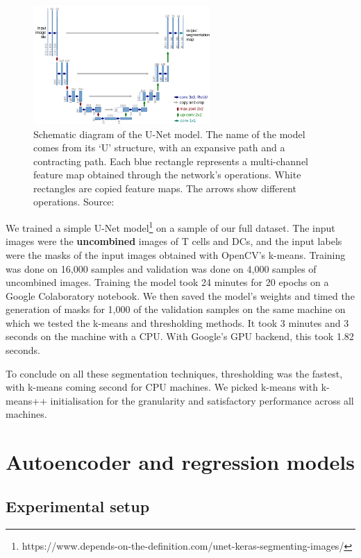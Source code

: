\begin{figure}[h!]
    \centering
    \includegraphics[width=0.6\textwidth]{dissertation/figures/unet_model.png}
    \caption{Schematic diagram of the U-Net model. The name of the model comes from its `U' structure, with an expansive path and a contracting path. Each blue rectangle represents a multi-channel feature map obtained through the network's operations. White rectangles are copied feature maps. The arrows show different operations. Source: \citet{ronneberger_unet_2015}}
    \label{fig:unet}
\end{figure}

We trained a simple U-Net model\footnote{https://www.depends-on-the-definition.com/unet-keras-segmenting-images/} on a sample of our full dataset. The input images were the \textbf{uncombined} images of T cells and DCs, and the input labels were the masks of the input images obtained with OpenCV's k-means. Training was done on 16,000 samples and validation was done on 4,000 samples of uncombined images. Training the model took 24 minutes for 20 epochs on a Google Colaboratory notebook. We then saved the model's weights and timed the generation of masks for 1,000 of the validation samples on the same machine on which we tested the k-means and thresholding methods. It took 3 minutes and 3 seconds on the machine with a CPU. With Google's GPU backend, this took 1.82 seconds. 

To conclude on all these segmentation techniques, thresholding was the fastest, with k-means coming second for CPU machines. We picked k-means with k-means++ initialisation for the granularity and satisfactory performance across all machines.

\section{Autoencoder and regression models}

\subsection{Experimental setup}

